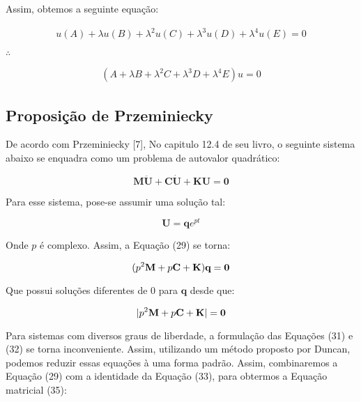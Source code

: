 \documentclass[a4paper,12p]{article}
\begin{document}
	Assim, obtemos a seguinte equação:

	\begin{equation}
	\begin{gathered}
	u (A)
	+ \lambda u (B)
	+ \lambda^{2} u (C)
	+ \lambda^{3} u (D)
	+ \lambda^{4} u (E)
	=
	0
	\end{gathered}
	\end{equation}
	\begin{center}
	$\therefore$
	\end{center}
	\begin{equation}
	\begin{gathered}
	(A + \lambda B + \lambda^{2} C + \lambda^{3} D + \lambda^{4} E) u =	0
	\end{gathered}
	\end{equation}
	
	\subsection{Proposição de Przeminiecky}
	
	De acordo com Przeminiecky [7], No capitulo 12.4 de seu livro, o seguinte sistema abaixo se enquadra como um problema de autovalor quadrático:
	
	\begin{equation}
	{\textbf{M}} \ddot{{\textbf{U}}} + {{\textbf{C}}} \dot{{\textbf{U}}} + {\textbf{KU}} = \textbf{{0}}
	\end{equation}
	
	Para esse sistema, pose-se assumir uma solução tal:
	
	\begin{equation}
	\textbf{U} = \textbf{q}e^{pt}
	\end{equation}
	
	Onde $p$ é complexo. Assim, a Equação (29) se torna:
	
	\begin{equation}
	(p^{2} \textbf{M} + p \textbf{\textbf{C}} + \textbf{K})\textbf{q} = \textbf{0}
	\end{equation}
	
	Que possui soluções diferentes de 0 para $\textbf{q}$ desde que:
	
	\begin{equation}
	|p^{2} \textbf{M} + p \textbf{\textbf{C}} + \textbf{K}| = \textbf{0}
	\end{equation}
	
	Para sistemas com diversos graus de liberdade, a formulação das Equações (31) e (32) se torna inconveniente. Assim, utilizando um método proposto por Duncan, podemos reduzir essas equações à uma forma padrão. Assim, combinaremos a Equação (29) com a identidade da Equação (33), para obtermos a Equação matricial (35):
	
\end{document}
